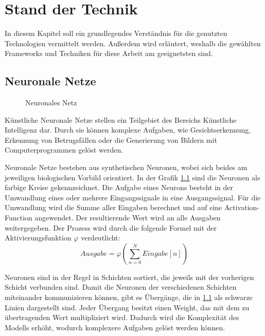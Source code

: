 
\chapter{Stand der Technik}
In diesem Kapitel soll ein grundlegendes Verständnis für die genutzten Technologien vermittelt werden.
Außerdem wird erläutert, weshalb die gewählten Frameworks und Techniken für diese Arbeit am geeignetsten sind.

\section{Neuronale Netze}

\begin{figure}[H]
	\centering
	\begin{neuralnetwork} 
		\hiddenlayer[count=5, bias=false]{} \linklayers
		\outputlayer[count=1]{} \linklayers
	\end{neuralnetwork} 
	\caption{Neuronales Netz}
	\label{img:neural-networks}
\end{figure}

Künstliche Neuronale Netze stellen ein Teilgebiet des Bereichs Künstliche Intelligenz dar.
Durch sie können komplexe Aufgaben, wie Gesichtserkennung, Erkennung von Betrugsfällen oder die Generierung von Bildern mit Computerprogrammen gelöst werden.
\newline

Neuronale Netze bestehen aus synthetischen Neuronen, wobei sich beides am jeweiligen biologischen Vorbild orientiert.
In der Grafik \cref{img:neural-networks} sind die Neuronen als farbige Kreise gekennzeichnet.
Die Aufgabe eines Neurons besteht in der Umwandlung eines oder mehrere Eingangssignale in eine Ausgangssignal.
Für die Umwandlung wird die Summe aller Eingaben berechnet und auf eine Activation-Function angewendet.
Der resultierende Wert wird an alle Ausgaben weitergegeben.
Der Prozess wird durch die folgende Formel mit der Aktivierungsfunktion $\varphi$ verdeutlicht:
\[ Ausgabe = \varphi ( \sum_{n=0}^N Eingabe[n] )\]

Neuronen sind in der Regel in Schichten sortiert, die jeweils mit der vorherigen Schicht verbunden sind.
Damit die Neuronen der verschiedenen Schichten miteinander kommunizieren können, gibt es Übergänge, die in \cref{img:neural-networks} als schwarze Linien dargestellt sind.
Jeder Übergang besitzt einen Weight, das mit dem zu übertragenden Wert multipliziert wird.
Dadurch wird die Komplexität des Modells erhöht, wodurch komplexere Aufgaben gelöst werden können.
\newline

